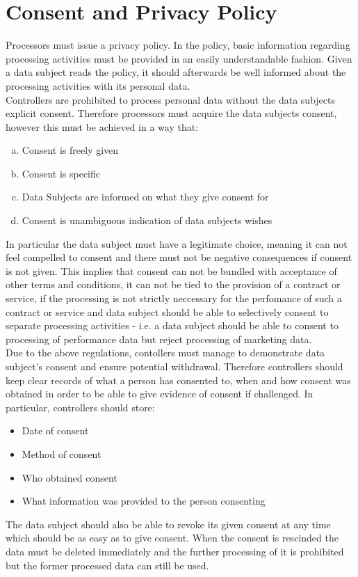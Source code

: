 \documentclass[a4paper,12pt]{report}
\begin{document}
	\section{Consent and Privacy Policy}
	\startsection
	Processors must issue a privacy policy.
	In the policy, basic information regarding processing activities must be provided in an easily understandable fashion.
	Given a data subject reads the policy, it should afterwards be well informed about the processing activities with its personal data.\\
	Controllers are prohibited to process personal data without the data subjects explicit consent.
	Therefore processors must acquire the data subjects consent, however this must be achieved in a way that:
	\begin{enumerate}[a)]
		\item Consent is freely given
		\item Consent is specific
		\item Data Subjects are informed on what they give consent for
		\item Consent is unambiguous indication of data subjects wishes
	\end{enumerate}
	In particular the data subject must have a legitimate choice, meaning it can not feel compelled to consent and there must not be negative consequences if consent is not given.
	This implies that consent can not be bundled with acceptance of other terms and conditions, 
	it can not be tied to the provision of a contract or service, if the processing is not strictly neccessary for the perfomance of such a contract or service and
	data subject should be able to selectively consent to separate processing activities - i.e. a data subject should be able to consent to processing of performance data but reject processing of marketing data.\\
	Due to the above regulations, contollers must manage to demonstrate data subject's consent and ensure potential withdrawal.
	Therefore controllers should keep clear records of what a person has consented to, when and how consent was obtained in order to be able to give evidence of consent if challenged. 
	In particular, controllers should store:
	\begin{itemize}
		\item Date of consent
		\item Method of consent
		\item Who obtained consent
		\item What information was provided to the person consenting
	\end{itemize}
	The data subject should also be able to revoke its given consent at any time which should be as easy as to give consent. When the consent is rescinded the data must be deleted immediately and the further processing of it is prohibited but the former processed data can still be used.
	\closesection
\end{document}
